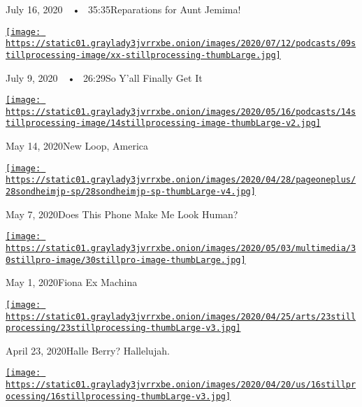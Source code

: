 July 16, 2020~~•~ 35:35Reparations for Aunt Jemima!

\href{https://www.nytimes3xbfgragh.onion/2020/07/09/podcasts/still-processing-black-lives-matter.html?action=click\&module=audio-series-bar\&region=header\&pgtype=Article}{\texttt{[image: https://static01.graylady3jvrrxbe.onion/images/2020/07/12/podcasts/09stillprocessing-image/xx-stillprocessing-thumbLarge.jpg]}}

July 9, 2020~~•~ 26:29So Y'all Finally Get It

\href{https://www.nytimes3xbfgragh.onion/2020/05/14/podcasts/still-processing-westworld-hollywood-utopia-dystopia.html?action=click\&module=audio-series-bar\&region=header\&pgtype=Article}{\texttt{[image: https://static01.graylady3jvrrxbe.onion/images/2020/05/16/podcasts/14stillprocessing-image/14stillprocessing-image-thumbLarge-v2.jpg]}}

May 14, 2020New Loop, America

\href{https://www.nytimes3xbfgragh.onion/2020/05/07/podcasts/still-processing-internet-vulnerability-sondheim-parks-recreation.html?action=click\&module=audio-series-bar\&region=header\&pgtype=Article}{\texttt{[image: https://static01.graylady3jvrrxbe.onion/images/2020/04/28/pageoneplus/28sondheimjp-sp/28sondheimjp-sp-thumbLarge-v4.jpg]}}

May 7, 2020Does This Phone Make Me Look Human?

\href{https://www.nytimes3xbfgragh.onion/2020/04/30/podcasts/still-processing-fiona-apple-fetch-bolt-cutters.html?action=click\&module=audio-series-bar\&region=header\&pgtype=Article}{\texttt{[image: https://static01.graylady3jvrrxbe.onion/images/2020/05/03/multimedia/30stillpro-image/30stillpro-image-thumbLarge.jpg]}}

May 1, 2020Fiona Ex Machina

\href{https://www.nytimes3xbfgragh.onion/2020/04/23/podcasts/still-processing-halle-berry-sharon-stone-catwoman-quarantine.html?action=click\&module=audio-series-bar\&region=header\&pgtype=Article}{\texttt{[image: https://static01.graylady3jvrrxbe.onion/images/2020/04/25/arts/23stillprocessing/23stillprocessing-thumbLarge-v3.jpg]}}

April 23, 2020Halle Berry? Hallelujah.

\href{https://www.nytimes3xbfgragh.onion/2020/04/16/podcasts/still-processing-AIDS-survive-coronavirus.html?action=click\&module=audio-series-bar\&region=header\&pgtype=Article}{\texttt{[image: https://static01.graylady3jvrrxbe.onion/images/2020/04/20/us/16stillprocessing/16stillprocessing-thumbLarge-v3.jpg]}}

